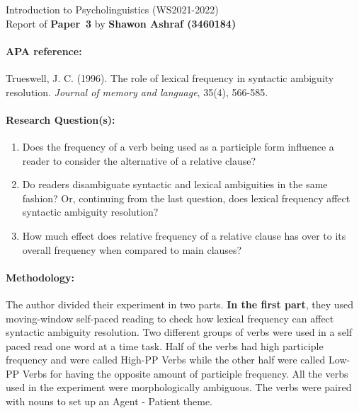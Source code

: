 \documentclass[12pt]{report}
\newcommand{\student}[3]{\begin{tcolorbox}\noindent Introduction to
    Psycholinguistics (WS2021-2022) \\ Report of \textbf{Paper~#3} by
    \textbf{#1 (#2)} 
  \end{tcolorbox}}
\begin{document}
\student{Shawon Ashraf}{3460184}{3}


\paragraph{APA reference:} 
Trueswell, J. C. (1996). The role of lexical frequency in syntactic ambiguity resolution. \textit{Journal of memory and language}, 35(4), 566-585.

\paragraph{Research Question(s):}

\begin{enumerate}
    \item Does the frequency of a verb being used as a participle form influence a reader to consider the alternative of a relative clause?
    
    \item Do readers disambiguate syntactic and lexical ambiguities in the same fashion? Or, continuing from the last question, does lexical frequency affect syntactic ambiguity resolution?
    
    \item How much effect does relative frequency of a relative clause has over to its overall frequency when compared to main clauses?
\end{enumerate}

\vfill
\paragraph{Methodology:} 

The author divided their experiment in two parts. \textbf{In the first part}, they used moving-window self-paced reading to check how lexical frequency can affect syntactic ambiguity resolution. Two different groups of verbs were used in a self paced read one word at a time task. Half of the verbs had high participle frequency and were called High-PP Verbs while the other half were called Low-PP Verbs for having the opposite amount of participle frequency. All the verbs used in the experiment were morphologically ambiguous. The verbs were paired with nouns to set up an Agent - Patient theme. 
\end{document}

